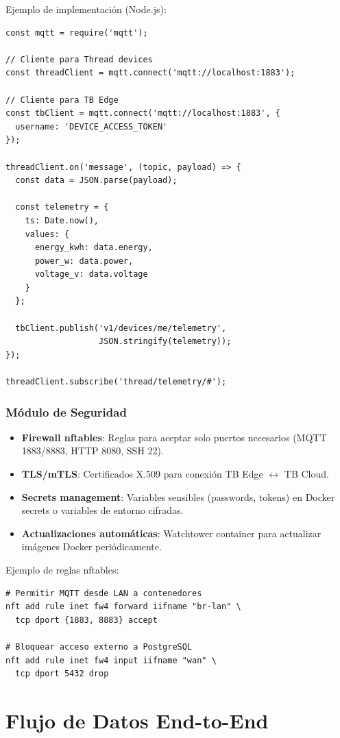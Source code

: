 Ejemplo de implementación (Node.js):
\begin{verbatim}
const mqtt = require('mqtt');

// Cliente para Thread devices
const threadClient = mqtt.connect('mqtt://localhost:1883');

// Cliente para TB Edge
const tbClient = mqtt.connect('mqtt://localhost:1883', {
  username: 'DEVICE_ACCESS_TOKEN'
});

threadClient.on('message', (topic, payload) => {
  const data = JSON.parse(payload);
  
  const telemetry = {
    ts: Date.now(),
    values: {
      energy_kwh: data.energy,
      power_w: data.power,
      voltage_v: data.voltage
    }
  };
  
  tbClient.publish('v1/devices/me/telemetry', 
                   JSON.stringify(telemetry));
});

threadClient.subscribe('thread/telemetry/#');
\end{verbatim}

\subsubsection{Módulo de Seguridad}

\begin{itemize}
    \item \textbf{Firewall nftables}: Reglas para aceptar solo puertos necesarios (MQTT 1883/8883, HTTP 8080, SSH 22).
    \item \textbf{TLS/mTLS}: Certificados X.509 para conexión TB Edge $\leftrightarrow$ TB Cloud.
    \item \textbf{Secrets management}: Variables sensibles (passwords, tokens) en Docker secrets o variables de entorno cifradas.
    \item \textbf{Actualizaciones automáticas}: Watchtower container para actualizar imágenes Docker periódicamente.
\end{itemize}

Ejemplo de reglas nftables:
\begin{verbatim}
# Permitir MQTT desde LAN a contenedores
nft add rule inet fw4 forward iifname "br-lan" \
  tcp dport {1883, 8883} accept

# Bloquear acceso externo a PostgreSQL
nft add rule inet fw4 input iifname "wan" \
  tcp dport 5432 drop
\end{verbatim}

\section{Flujo de Datos End-to-End}


